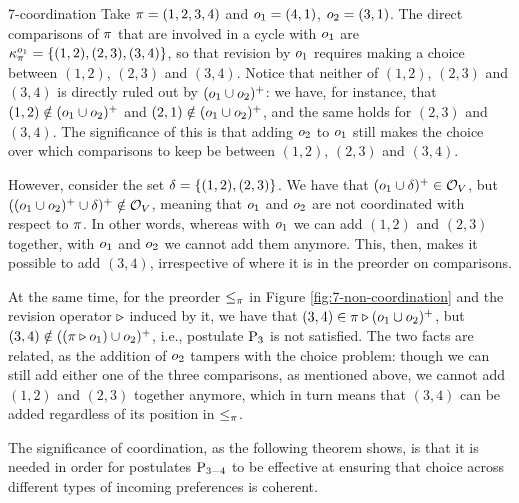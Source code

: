 \begin{xmpl}{}{7-coordination}
	Take $\pi=(1,2,3,4)$ and $o_1=(4,1)$, $o_2=(3,1)$.
	The direct comparisons of $\pi$ that are involved in a cycle
	with $o_1$ are $\kappa_{\pi}^{o_1}=\{(1,2),(2,3),(3,4)\}$,
	so that revision by $o_1$ requires making a choice between $(1,2)$, $(2,3)$ and $(3,4)$.
	Notice that neither of $(1,2)$, $(2,3)$ and $(3,4)$ is directly ruled out by 
	$(o_1\cup o_2)^+$: we have, for instance, that $(1,2)\notin(o_1\cup o_2)^+$
	and $(2,1)\notin(o_1\cup o_2)^+$, and the same holds for $(2,3)$ and $(3,4)$.
	The significance of this is that adding $o_2$ to $o_1$ still 
	makes the choice over which comparisons to keep be between 
	$(1,2)$, $(2,3)$ and $(3,4)$.
	
	However, consider the set
	$\delta=\{(1,2),(2,3)\}$. We have that 
	$(o_1\cup\delta)^+\in\mathcal{O}_V$, but $((o_1\cup o_2)^+\cup\delta)^+\notin\mathcal{O}_V$,
	meaning that $o_1$ and $o_2$ are not coordinated with respect to $\pi$.
	In other words, whereas with $o_1$ we can add $(1,2)$ and $(2,3)$ together,
	with $o_1$ and $o_2$ we cannot add them anymore.
	This, then, makes it possible to add $(3,4)$, irrespective of where it 
	is in the preorder on comparisons.
	
	At the same time, for the preorder $\le_\pi$ in Figure \ref{fig:7-non-coordination}
	and the revision operator $\triangleright$ induced by it,
	we have that $(3,4)\in\pi\triangleright(o_1\cup o_2)^+$, but $(3,4)\notin((\pi\triangleright o_1)\cup o_2)^+$,
	i.e., postulate $\mathrm{P}_{3}$ is not satisfied.
	The two facts are related, as the addition of $o_2$ tampers with the choice problem:
	though we can still add either one of the three comparisons, 
	as mentioned above,
	we cannot add $(1,2)$ and $(2,3)$
	together anymore, which in turn means that 
	$(3,4)$ can be added regardless of its position in $\le_\pi$. 
\end{xmpl}

The significance of coordination, as the following theorem shows,
is that it is needed in order for postulates $\mathrm{P}_{3-4}$ to be effective at 
ensuring that choice across different types of incoming preferences
is coherent.

